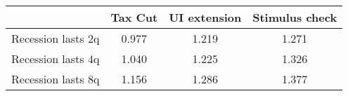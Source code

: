 \begin{tabular}{@{}lccc@{}} 
\toprule 
& Tax Cut    & UI extension    & Stimulus check    \\  \midrule 
Recession lasts 2q &0.977  & 1.219  & 1.271     \\ 
Recession lasts 4q &1.040  & 1.225  & 1.326     \\ 
Recession lasts 8q &1.156  & 1.286  & 1.377     \\ 
\end{tabular}  
